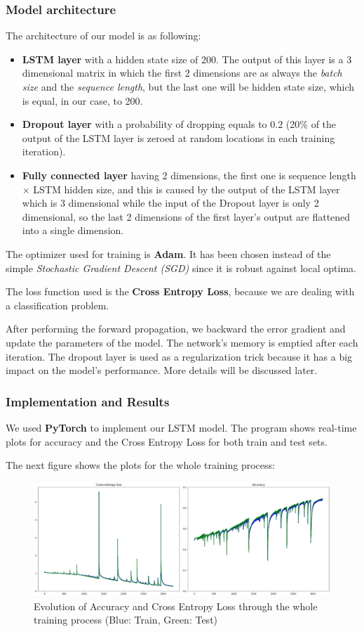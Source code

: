 \documentclass[a4paper,english,12pt]{article}
\begin{document}
\subsubsection{Model architecture}
The architecture of our model is as following:
\begin{itemize}
	\item \textbf{LSTM layer} with a hidden state size of 200. The output of this layer is a 3 dimensional matrix in which the first 2 dimensions are as always the \emph{batch size} and the \emph{sequence length}, but the last one will be hidden state size, which is equal, in our case, to 200.
	\item \textbf{Dropout layer} with a probability of dropping equals to $0.2$ (20\% of the output of the LSTM layer is zeroed at random locations in each training iteration).
	\item \textbf{Fully connected layer} having 2 dimensions, the first one is sequence length $\times$ LSTM hidden size, and this is caused by the output of the LSTM layer which is 3 dimensional while the input of the Dropout layer is only 2 dimensional, so the last 2 dimensions of the first layer's output are flattened into a single dimension.
\end{itemize}

The optimizer used for training is \textbf{Adam}. It has been chosen instead of the simple \emph{Stochastic Gradient Descent (SGD)} since it is robust against local optima.

The loss function used is the \textbf{Cross Entropy Loss}, because we are dealing with a classification problem.

After performing the forward propagation, we backward the error gradient and update the parameters of the model. The network's memory is emptied after each iteration. The dropout layer is used as a regularization trick because it has a big impact on the model's performance. More details will be discussed later. 

\subsubsection{Implementation and Results}
We used \textbf{PyTorch} to implement our LSTM model. The program shows real-time plots for accuracy and the Cross Entropy Loss for both train and test sets.

The next figure shows the plots for the whole training process:

\begin{figure}[H]
\centering
\includegraphics[width=\textwidth]{acc_loss}
\caption{Evolution of Accuracy and Cross Entropy Loss through the whole training process (Blue: Train, Green: Test)}
\end{figure}
\end{document}
